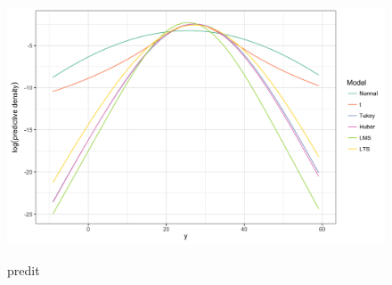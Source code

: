 \documentclass[11pt]{article}
\begin{document}
\begin{figure}
\centering
{\includegraphics[width=\textwidth]{figs/speed_of_light_predictive.png}}
\label{fig:newcomb_predictive}
\caption{predit}
\end{figure}





\end{document}
